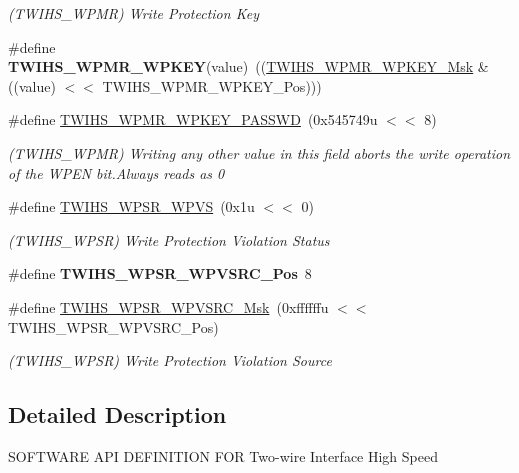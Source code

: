 \begin{DoxyCompactItemize}
\begin{DoxyCompactList}\small\item\em (T\+W\+I\+H\+S\+\_\+\+W\+P\+MR) Write Protection Key \end{DoxyCompactList}\item 
\mbox{\label{group__SAMS70__TWIHS_gad1eb34788ba32551c14ab91fc551eef3}} 
\#define {\bfseries T\+W\+I\+H\+S\+\_\+\+W\+P\+M\+R\+\_\+\+W\+P\+K\+EY}(value)~((\mbox{\hyperlink{group__SAMV71__TWIHS_gad433cad3185d19b00f7c05e49cbd7e13}{T\+W\+I\+H\+S\+\_\+\+W\+P\+M\+R\+\_\+\+W\+P\+K\+E\+Y\+\_\+\+Msk}} \& ((value) $<$$<$ T\+W\+I\+H\+S\+\_\+\+W\+P\+M\+R\+\_\+\+W\+P\+K\+E\+Y\+\_\+\+Pos)))
\item 
\mbox{\label{group__SAMS70__TWIHS_ga99fd2617318e1cd366fe866630322573}} 
\#define \mbox{\hyperlink{group__SAMS70__TWIHS_ga99fd2617318e1cd366fe866630322573}{T\+W\+I\+H\+S\+\_\+\+W\+P\+M\+R\+\_\+\+W\+P\+K\+E\+Y\+\_\+\+P\+A\+S\+S\+WD}}~(0x545749u $<$$<$ 8)
\begin{DoxyCompactList}\small\item\em (T\+W\+I\+H\+S\+\_\+\+W\+P\+MR) Writing any other value in this field aborts the write operation of the W\+P\+EN bit.\+Always reads as 0 \end{DoxyCompactList}\item 
\mbox{\label{group__SAMS70__TWIHS_ga6238966d28ce45cc4ee70af09739d249}} 
\#define \mbox{\hyperlink{group__SAMS70__TWIHS_ga6238966d28ce45cc4ee70af09739d249}{T\+W\+I\+H\+S\+\_\+\+W\+P\+S\+R\+\_\+\+W\+P\+VS}}~(0x1u $<$$<$ 0)
\begin{DoxyCompactList}\small\item\em (T\+W\+I\+H\+S\+\_\+\+W\+P\+SR) Write Protection Violation Status \end{DoxyCompactList}\item 
\mbox{\label{group__SAMS70__TWIHS_ga520c6f8353b3d82140d67e67bdb3197f}} 
\#define {\bfseries T\+W\+I\+H\+S\+\_\+\+W\+P\+S\+R\+\_\+\+W\+P\+V\+S\+R\+C\+\_\+\+Pos}~8
\item 
\mbox{\label{group__SAMS70__TWIHS_gaa7dece5c12c4e3de6238432a6fb75c76}} 
\#define \mbox{\hyperlink{group__SAMS70__TWIHS_gaa7dece5c12c4e3de6238432a6fb75c76}{T\+W\+I\+H\+S\+\_\+\+W\+P\+S\+R\+\_\+\+W\+P\+V\+S\+R\+C\+\_\+\+Msk}}~(0xffffffu $<$$<$ T\+W\+I\+H\+S\+\_\+\+W\+P\+S\+R\+\_\+\+W\+P\+V\+S\+R\+C\+\_\+\+Pos)
\begin{DoxyCompactList}\small\item\em (T\+W\+I\+H\+S\+\_\+\+W\+P\+SR) Write Protection Violation Source \end{DoxyCompactList}\end{DoxyCompactItemize}


\subsection{Detailed Description}
S\+O\+F\+T\+W\+A\+RE A\+PI D\+E\+F\+I\+N\+I\+T\+I\+ON F\+OR Two-\/wire Interface High Speed 